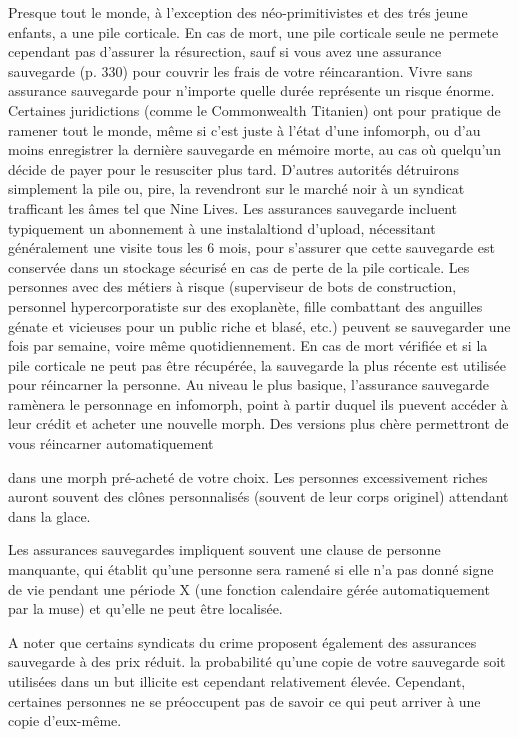 Presque tout le monde, à l'exception des néo-primitivistes et des trés jeune enfants, a une pile corticale. En cas de mort, une pile corticale seule ne permete cependant pas d'assurer la résurection, sauf si vous avez une assurance sauvegarde (p. 330) pour couvrir les frais de votre réincarantion. Vivre sans assurance sauvegarde pour n'importe quelle durée représente un risque énorme. Certaines juridictions (comme le Commonwealth Titanien) ont pour pratique de ramener tout le monde, même si c'est juste à l'état d'une infomorph, ou d'au moins enregistrer la dernière sauvegarde en mémoire morte, au cas où quelqu'un décide de payer pour le resusciter plus tard. D'autres autorités détruirons simplement la pile ou, pire, la revendront sur le marché noir à un syndicat trafficant les âmes tel que Nine Lives. Les assurances sauvegarde incluent typiquement un abonnement à une instalaltiond d'upload, nécessitant généralement une visite tous les 6 mois, pour s'assurer que cette sauvegarde est conservée dans un stockage sécurisé en cas de perte de la pile corticale. Les personnes avec des métiers à risque (superviseur de bots de construction, personnel hypercorporatiste sur des exoplanète, fille combattant des anguilles génate et vicieuses pour un public riche et blasé, etc.) peuvent se sauvegarder une fois par semaine, voire même quotidiennement. En cas de mort vérifiée et si la pile corticale ne peut pas être récupérée, la sauvegarde la plus récente est utilisée pour réincarner la personne. Au niveau le plus basique, l'assurance sauvegarde ramènera le personnage en infomorph, point à partir duquel ils puevent accéder à leur crédit et acheter une nouvelle morph. Des versions plus chère permettront de vous réincarner automatiquement 

dans une morph pré-acheté de votre choix. Les personnes excessivement riches auront souvent des clônes personnalisés (souvent de leur corps originel) attendant dans la glace. 

Les assurances sauvegardes impliquent souvent une clause de personne manquante, qui établit qu'une personne sera ramené si elle n'a pas donné signe de vie pendant une période X (une fonction calendaire gérée automatiquement par la muse) et qu'elle ne peut être localisée. 

A noter que certains syndicats du crime proposent également des assurances sauvegarde à des prix réduit. la probabilité qu'une copie de votre sauvegarde soit utilisées dans un but illicite est cependant relativement élevée. Cependant, certaines personnes ne se préoccupent pas de savoir ce qui peut arriver à une copie d'eux-même. 

